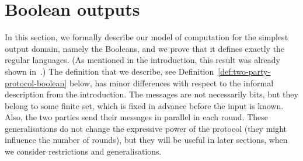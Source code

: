 
\section{Boolean outputs}
\label{sec:boolean-domain}

In this section, we formally describe our model of computation for the simplest
output domain, namely the Booleans, and we prove that it defines exactly the
regular languages. (As mentioned in the introduction, this result was already shown in~\cite{hauser1989}.)  The definition that we describe, see
Definition~\ref{def:two-party-protocol-boolean} below, has minor differences
with respect to the informal description from the introduction. The messages
are not necessarily bits, but they belong to some finite set, which is fixed in
advance before the input is known. Also,  the two parties send their messages
in parallel in each round. These generalisations do not change the expressive
power of the protocol (they might influence the number of rounds), but they
will be useful in later sections, when we consider restrictions and
generalisations. 

